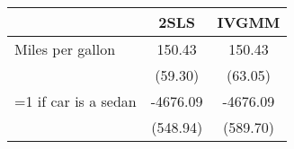 \begin{tabular}{lcc}
    \toprule
     & 2SLS & IVGMM \\
    \midrule
    Miles per gallon & 150.43 & 150.43 \\
      & (59.30) & (63.05) \\
    =1 if car is a sedan & -4676.09 & -4676.09 \\
      & (548.94) & (589.70) \\
    \bottomrule
    \end{tabular}